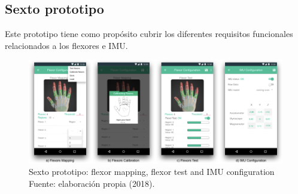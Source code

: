\subsection{Sexto  prototipo}
\label{sexto-prototipo}
Este prototipo tiene como propósito cubrir los diferentes requisitos funcionales relacionados a los flexores e IMU.

\begin{figure}[H]
	\centering
	\captionsetup{justification=centering}
   	\includegraphics[width=1.0\textwidth]{images/chapter03/06-prototype/06-prototype.png} 
            \caption[Sexto prototipo: flexor mapping, flexor test and IMU configuration]{Sexto prototipo: flexor mapping, flexor test and IMU configuration\\ Fuente: elaboración propia (2018).}
    \label{fig:prototype-06}
\end{figure}